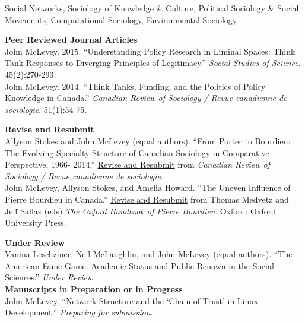 \documentclass[9pt,usenames,dvipsnames]{article}
\begin{document}

\noindent Social Networks, Sociology of Knowledge \& Culture, Political Sociology \& Social Movements, Computational Sociology, Environmental Sociology \\


\ind \textbf{Peer Reviewed Journal Articles} \\

\ind John McLevey. 2015. ``Understanding Policy Research in Liminal Spaces: Think Tank Responses to Diverging Principles of Legitimacy.'' \emph{Social Studies of Science}. 45(2):270-293. \\

\ind John McLevey. 2014. ``Think Tanks, Funding, and the Politics of Policy Knowledge in Canada.'' \emph{Canadian Review of Sociology / Revue canadienne de sociologie}. 51(1):54-75.\\


\ind \textbf{Revise and Resubmit} \\

\ind Allyson Stokes and John McLevey (equal authors). ``From Porter to Bourdieu: The Evolving Specialty Structure of Canadian Sociology in Comparative Perspective, 1966- 2014.'' \underline{Revise and Resubmit} from \emph{Canadian Review of Sociology / Revue canadienne de sociologie}. \\

\ind John McLevey, Allyson Stokes, and Amelia Howard. ``The Uneven Influence of Pierre Bourdieu in Canada.'' \underline{Revise and Resubmit} from Thomas Medvetz and Jeff Sallaz (eds) \emph{The Oxford Handbook of Pierre Bourdieu}. Oxford: Oxford University Press.

\pagebreak
\ind \textbf{Under Review} \\

\ind Vanina Leschziner, Neil McLaughlin, and John McLevey (equal authors). ``The American Fame Game: Academic Status and Public Renown in the Social Sciences.'' \emph{Under Review}. \\

\ind \textbf{Manuscripts in Preparation or in Progress} \\

\ind John McLevey. ``Network Structure and the `Chain of Trust' in Linux Development.'' \emph{Preparing for submission}. \\
\end{document}
